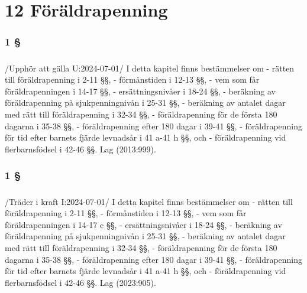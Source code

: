 \documentclass[a4paper,notitlepage,openany,10pt]{book}
\begin{document}
\chapter*{12 Föräldrapenning}
\subsection*{1 §}
\paragraph*{}
/Upphör att gälla U:2024-07-01/
I detta kapitel finns bestämmelser om
\newline - rätten till föräldrapenning i 2-11 §§,
\newline - förmånstiden i 12-13 §§,
\newline - vem som får föräldrapenningen i 14-17 §§,
\newline - ersättningsnivåer i 18-24 §§,
\newline - beräkning av föräldrapenning på sjukpenningnivån i 25-31 §§,
\newline - beräkning av antalet dagar med rätt till föräldrapenning i 32-34 §§,
\newline - föräldrapenning för de första 180 dagarna i 35-38 §§,
\newline - föräldrapenning efter 180 dagar i 39-41 §§,
\newline - föräldrapenning för tid efter barnets fjärde levnadsår i 41 a-41 h §§, och
\newline - föräldrapenning vid flerbarnsfödsel i 42-46 §§.
Lag (2013:999).
\subsection*{1 §}
\paragraph*{}
/Träder i kraft I:2024-07-01/
I detta kapitel finns bestämmelser om
\newline - rätten till föräldrapenning i 2-11 §§,
\newline - förmånstiden i 12-13 §§,
\newline - vem som får föräldrapenningen i 14-17 c §§,
\newline - ersättningsnivåer i 18-24 §§,
\newline - beräkning av föräldrapenning på sjukpenningnivån i 25-31 §§,
\newline - beräkning av antalet dagar med rätt till föräldrapenning i 32-34 §§,
\newline - föräldrapenning för de första 180 dagarna i 35-38 §§,
\newline - föräldrapenning efter 180 dagar i 39-41 §§,
\newline - föräldrapenning för tid efter barnets fjärde levnadsår i 41 a-41 h §§, och
\newline - föräldrapenning vid flerbarnsfödsel i 42-46 §§.
Lag (2023:905).
\end{document}
